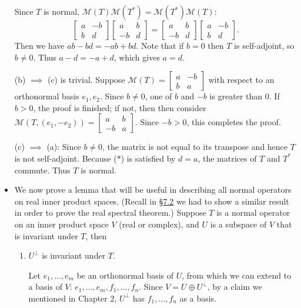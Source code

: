 \documentclass[11pt]{article}
\newcommand{\lk}[2]{\hyperlink{subsection.#1.#2}{\S#1.#2}}
\newcommand{\M}{\mathcal{M}}
\begin{document}
\begin{itemize}
    Since $T$ is normal, $\M(T)\M(T^*) = \M(T^*)\M(T)$:
    \begin{equation}\begin{bmatrix}
        a & -b \\ b & d
    \end{bmatrix} \begin{bmatrix}
        a & b \\ -b & d
    \end{bmatrix} = \begin{bmatrix}
         a & b \\ -b & d
    \end{bmatrix}\begin{bmatrix}
        a & -b \\ b & d
    \end{bmatrix}. \tag{$\ast$}
    \end{equation}
    Then we have $ab-bd=-ab+bd$. Note that if $b=0$ then $T$ is self-adjoint, so $b \neq 0$. Thus $a-d=-a+d$, which gives $a = d$.

    (b) $\implies$ (c) is trivial. Suppose $\M(T) = \begin{bmatrix}
        a & -b \\ b & a
    \end{bmatrix}$ with respect to an orthonormal basis $e_1,e_2$. Since $b \neq 0$, one of $b$ and $-b$ is greater than 0. If $b > 0$, the proof is finished; if not, then then consider $\M(T,(e_1,-e_2)) =
        \begin{bmatrix}
        a & b \\ -b & a
    \end{bmatrix}$. Since $-b > 0$, this completes the proof.

    (c) $\implies$ (a): Since $b \neq 0$, the matrix is not equal to its transpose and hence $T$ is not self-adjoint. Because ($\ast$) is satisfied by $d=a$, the matrices of $T$ and $T^*$ commute. Thus $T$ is normal.
    \item We now prove a lemma that will be useful in describing all normal operators on real inner product spaces. (Recall in \lk{7}{2} we had to show a similar result in order to prove the real spectral theorem.) Suppose $T$ is a normal operator on an inner product space $V$ (real or complex), and $U$ is a subspace of $V$ that is invariant under $T$, then
    \begin{enumerate}[label=(\alph*)]
        \item $U^\perp$ is invariant under $T$.
        
        Let $e_1,\dots,e_m$ be an orthonormal basis of $U$, from which we can extend to a basis of $V$: $e_1,\dots,e_m,f_1,\dots,f_n$. Since $V = U \oplus U^\perp$, by a claim we mentioned in Chapter 2, $U^\perp$ has $f_1,\dots,f_n$ as a basis.


\end{enumerate}
\end{itemize}
\end{document}
